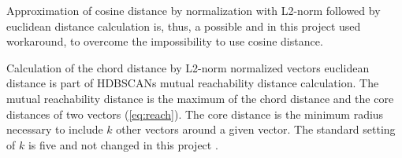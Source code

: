  Approximation of cosine distance by normalization with L2-norm followed by euclidean distance calculation is, thus, a possible and in this project used workaround, to overcome the impossibility to use cosine distance. 





Calculation of the chord distance by L2-norm normalized vectors euclidean distance is part of \glspl{HDBSCAN} mutual reachability distance calculation. The mutual reachability distance is the maximum of the chord distance and the core distances of two vectors (\autoref{eq:reach}). The core distance is the minimum radius necessary to include $k$ other vectors around a given vector. The standard setting of $k$ is five and not changed in this project \autocite{mcinnes_hdbscan_2017}. 

